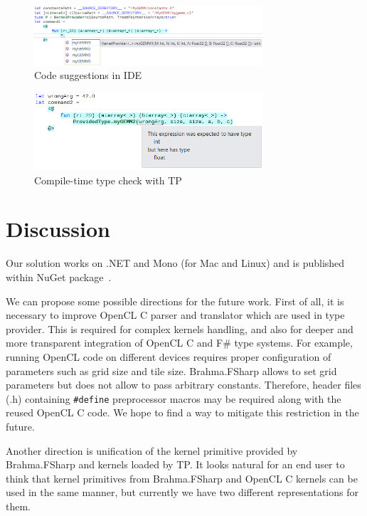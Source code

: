 \documentclass[sigplan,review]{acmart}\settopmatter{printfolios=true}
\begin{document}
\begin{figure}[h]
\centering
\includegraphics[width=8.5cm]{graphics/example-multiple-suggestions.png}
\caption{Code suggestions in IDE}
\label{pic:suggestions}
\end{figure}

\begin{figure}[h]
\centering
\includegraphics[width=8.5cm]{graphics/example-compile-error.png}
\caption{Compile-time type check with TP}
\label{pic:error}
\end{figure}

\section{Discussion}

Our solution works on .NET and Mono (for Mac and Linux) and is published within NuGet package~\cite{Brahma.FSharp.NuGet}.

We can propose some possible directions for the future work. First of all, it is necessary to improve OpenCL C parser and translator which are used in type provider.
This is required for complex kernels handling, and also for deeper and more transparent integration of OpenCL C and F\# type systems.
For example, running OpenCL code on different devices requires proper configuration of parameters such as grid size and tile size. 
Brahma.FSharp allows to set grid parameters but does not allow to pass arbitrary constants. 
Therefore, header files (.h) containing \lstinline{#define} preprocessor macros may be required along with the reused OpenCL C code. 
We hope to find a way to mitigate this restriction in the future.

Another direction is unification of the kernel primitive provided by Brahma.FSharp and kernels loaded by TP.
It looks natural for an end user to think that kernel primitives from Brahma.FSharp and OpenCL C kernels can be used in the same manner, but currently we have two different representations for them.
\end{document}
